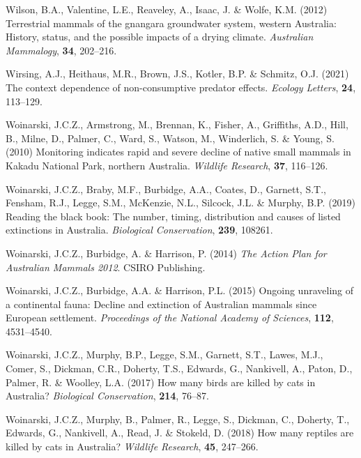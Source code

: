 \documentclass[11pt,a4paper,titlepage,twoside,openright]{style/unimelbthesis}
\begin{document}
\begin{mainmatter}
\leavevmode\hypertarget{ref-wilson2012terrestrial}{}%
Wilson, B.A., Valentine, L.E., Reaveley, A., Isaac, J. \& Wolfe, K.M. (2012) Terrestrial mammals of the gnangara groundwater system, western Australia: History, status, and the possible impacts of a drying climate. \emph{Australian Mammalogy}, \textbf{34}, 202--216.

\leavevmode\hypertarget{ref-wirsing2021context}{}%
Wirsing, A.J., Heithaus, M.R., Brown, J.S., Kotler, B.P. \& Schmitz, O.J. (2021) The context dependence of non-consumptive predator effects. \emph{Ecology Letters}, \textbf{24}, 113--129.

\leavevmode\hypertarget{ref-woinarski2010monitoring}{}%
Woinarski, J.C.Z., Armstrong, M., Brennan, K., Fisher, A., Griffiths, A.D., Hill, B., Milne, D., Palmer, C., Ward, S., Watson, M., Winderlich, S. \& Young, S. (2010) Monitoring indicates rapid and severe decline of native small mammals in Kakadu National Park, northern Australia. \emph{Wildlife Research}, \textbf{37}, 116--126.

\leavevmode\hypertarget{ref-woinarski2019reading}{}%
Woinarski, J.C.Z., Braby, M.F., Burbidge, A.A., Coates, D., Garnett, S.T., Fensham, R.J., Legge, S.M., McKenzie, N.L., Silcock, J.L. \& Murphy, B.P. (2019) Reading the black book: The number, timing, distribution and causes of listed extinctions in Australia. \emph{Biological Conservation}, \textbf{239}, 108261.

\leavevmode\hypertarget{ref-woinarski2014action}{}%
Woinarski, J.C.Z., Burbidge, A. \& Harrison, P. (2014) \emph{The Action Plan for Australian Mammals 2012}. CSIRO Publishing.

\leavevmode\hypertarget{ref-woinarski2015ongoing}{}%
Woinarski, J.C.Z., Burbidge, A.A. \& Harrison, P.L. (2015) Ongoing unraveling of a continental fauna: Decline and extinction of Australian mammals since European settlement. \emph{Proceedings of the National Academy of Sciences}, \textbf{112}, 4531--4540.

\leavevmode\hypertarget{ref-woinarski2017birds}{}%
Woinarski, J.C.Z., Murphy, B.P., Legge, S.M., Garnett, S.T., Lawes, M.J., Comer, S., Dickman, C.R., Doherty, T.S., Edwards, G., Nankivell, A., Paton, D., Palmer, R. \& Woolley, L.A. (2017) How many birds are killed by cats in Australia? \emph{Biological Conservation}, \textbf{214}, 76--87.

\leavevmode\hypertarget{ref-woinarski2018reptiles}{}%
Woinarski, J.C.Z., Murphy, B., Palmer, R., Legge, S., Dickman, C., Doherty, T., Edwards, G., Nankivell, A., Read, J. \& Stokeld, D. (2018) How many reptiles are killed by cats in Australia? \emph{Wildlife Research}, \textbf{45}, 247--266.


\end{mainmatter}
\end{document}

